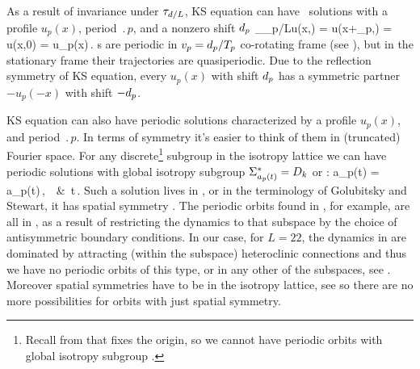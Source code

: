 As a result of invariance under $\tau_{d/L}$,
KS equation can have \rpo\ solutions
with a profile $u_p(x)$, period $\period{p}$, and a
nonzero shift $d_p$
\beq
  \Shift_{\shift_p/L}u(x,) =
  u(x+\shift_p,) = u(x,0) = u_p(x)\,.
\label{KSrpos}
\eeq
{\Rpo s}  are periodic in
$v_p=d_p/{T_{p}}$ co-rotating frame (see
), but in the stationary frame their
trajectories are quasiperiodic.  Due to the reflection symmetry
 of KS equation, every {\rpo} $u_p(x)$ with shift
$d_p$ has a symmetric partner $-u_p(-x)$ with shift $-d_p$.


KS equation can also have periodic solutions
characterized by a profile $u_p(x)$,
and period $\period{p}$. In terms of symmetry it's easier to think of them
in (truncated) Fourier space. For any discrete\footnote{Recall from that  fixes the origin, so
we cannot have periodic orbits with global isotropy subgroup .} subgroup in the isotropy lattice
we can have periodic solutions with global isotropy subgroup $\Sigma^*_{a_p(t)}=D_{k}$ or :
\beq
  \gamma a_p(t) = a_p(t)\,, \qquad \forall \gamma\in{}\,\ \&\ \forall t\in[0,\period{p}]\,.
\eeq
Such a solution lives in , or in the terminology of Golubitsky and Stewart,
it has spatial symmetry . The periodic orbits found in , for example, 
are all in , as a result of restricting the dynamics to that subspace by the choice of antisymmetric
boundary conditions. In our case, for $L=22$, the dynamics in  are dominated by attracting (within
the subspace) heteroclinic connections and thus we have no periodic orbits of this type, or in
any other of the  subspaces, see . Moreover spatial symmetries have to
be in the isotropy lattice, see \cite[Chapter 3]{golubitsky2002sp} so there are no more possibilities
for orbits with just spatial symmetry.

